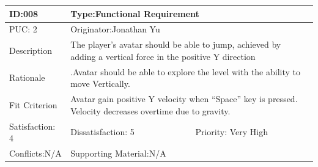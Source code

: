 \documentclass{article}
\begin{document}
\begin{table}[H]
\begin{tabular}{|l|l|l|}
\hline
ID:008&\multicolumn{2}{l|}{Type:Functional Requirement} \\ \hline
PUC: 2& \multicolumn{2}{l|}{Originator:Jonathan Yu} \\ \hline
Description & \multicolumn{2}{m{0.85\textwidth}|}{The player’s avatar should be able to jump, achieved by adding a vertical force in the positive Y direction }\\\hline
Rationale & \multicolumn{2}{m{0.85\textwidth}|}{.Avatar should be able to explore the level with the ability to move Vertically.} \\ \hline
Fit Criterion & \multicolumn{2}{m{0.85\textwidth}|}{Avatar gain positive Y velocity when  “Space” key is pressed. Velocity decreases overtime due to gravity.} \\ \hline
Satisfaction: 4 & Dissatisfaction: 5 & Priority: Very High \\ \hline
Conflicts:N/A & \multicolumn{2}{l|}{Supporting Material:N/A} \\ \hline
\end{tabular}
\end{table}
\end{document}
